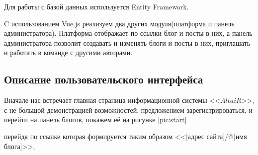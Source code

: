 Для работы с базой данных используется Entity Framework.

C использованием Vue.js реализуем два других модуля(платформа и панель администратора). Платформа отображает по ссылки блог и посты в них, а панель администратора позволит создавать и изменять блоги и посты в них, приглашать и работать в команде с другими авторами. 

\pagebreak
\subsection{Описание пользовательского интерфейса}

Вначале нас встречает главная страница информационной системы <<$AltaiR$>>, с не большой демонстрацией возможностей, предложением зарегистрироваться, и перейти на панель блогов, покажем её на рисунке \ref{pic:start}


перейдя по ссылке которая формируется таким образом <<[адрес сайта]/@[имя блога]>>,

\pagebreak